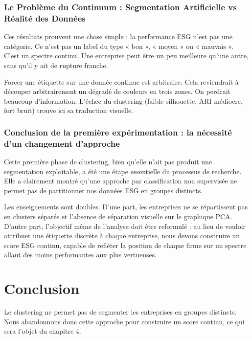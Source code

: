 \subsubsection{Le Problème du Continuum : Segmentation Artificielle vs Réalité des Données}

Ces résultats prouvent une chose simple : la performance ESG n’est pas une catégorie. Ce n’est pas un label du type « bon », « moyen » ou « mauvais ». C’est un spectre continu. Une entreprise peut être un peu meilleure qu’une autre, sans qu’il y ait de rupture franche.

Forcer une étiquette sur une donnée continue est arbitraire. Cela reviendrait à découper arbitrairement un dégradé de couleurs en trois zones. On perdrait beaucoup d’information. L’échec du clustering (faible silhouette, ARI médiocre, fort bruit) trouve ici sa traduction visuelle.

\subsubsection{Conclusion de la première expérimentation : la nécessité d’un changement d’approche}

Cette première phase de clustering, bien qu’elle n’ait pas produit une segmentation exploitable, a été une étape essentielle du processus de recherche. Elle a clairement montré qu’une approche par classification non supervisée ne permet pas de partitionner nos données ESG en groupes distincts.

Les enseignements sont doubles. D’une part, les entreprises ne se répartissent pas en clusters séparés et l’absence de séparation visuelle sur le graphique PCA. D’autre part, l’objectif même de l’analyse doit être reformulé : au lieu de vouloir attribuer une étiquette discrète à chaque entreprise, nous devons construire un score ESG continu, capable de refléter la position de chaque firme sur un spectre allant des moins performantes aux plus vertueuses.

\section*{Conclusion}

Le clustering ne permet pas de segmenter les entreprises en groupes distincts. Nous abandonnons donc cette approche pour construire un score continu, ce qui sera l’objet du chapitre 4.